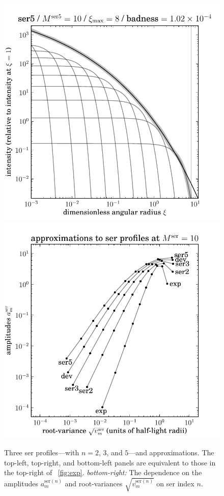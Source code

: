 \documentclass[12pt,pdftex,preprint]{aastex}
\newlength{\figurewidth}
\newcommand{\ser}{\mathrm{ser}}
\begin{document}
\begin{figure}
\includegraphics[width=\figurewidth]{ser5_K10_MR08_profile_log.pdf}%
\includegraphics[width=\figurewidth]{mixtures_vs_model_K10.pdf}
\caption{Three ser profiles---with $n=2$, $3$, and $5$---and
  approximations.  The top-left, top-right, and bottom-left panels are
  equivalent to those in the top-right of \figurename~\ref{fig:exp}.
  \textsl{bottom-right:} The dependence on the amplitudes $a^{\ser(n)}_m$
  and root-variances $\sqrt{v^{\ser(n)}_m}$ on ser index $n$.\label{fig:ser}}
\end{figure}
\end{document}
